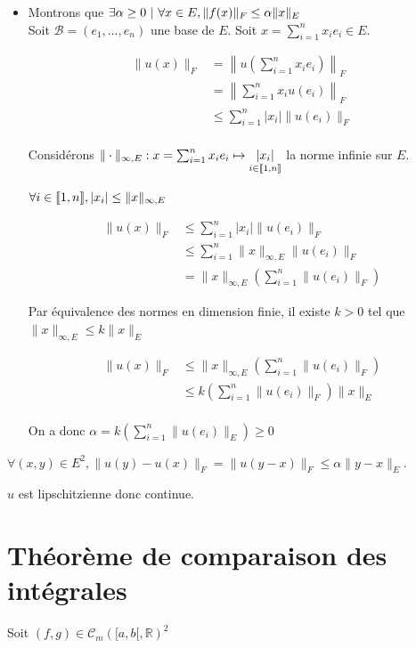\documentclass[]{article}
\begin{document}
\begin{itemize}
    \item Montrons que $\exists \alpha \geq 0 \text{ } | \text{ } \forall x \in E, \|f(x)\|_F \leq \alpha \|x\|_E$\\
    
    Soit $\mathcal{B} = (e_1,\dots, e_n)$ une base de $E$. Soit $x = \sum_{i=1}^{n} x_i e_i \in E$. 

    \begin{align*}
        \|u(x)\|_F &= \left \|u(\sum_{i=1}^{n} x_i e_i ) \right \|_F \\
        &= \left \| \sum_{i=1}^{n} x_i u(e_i) \right \|_F \\
        &\leq \sum_{i=1}^{n} |x_i| \| u(e_i) \|_F \\
    \end{align*}

    Considérons $\|\cdot\|_{\infty, E} : x = \sum_{i=1}^{n} x_i e_i \mapsto \underset{i \in \llbracket {1}, {n} \rrbracket}{|x_i|}$ la norme infinie sur $E$. 
    
    $\forall i \in \llbracket {1}, {n} \rrbracket, |x_i| \leq \|x\|_{\infty, E}$

    \begin{align*}
        \|u(x)\|_F 
        &\leq \sum_{i=1}^{n} |x_i| \| u(e_i) \|_F \\
        &\leq \sum_{i=1}^{n} \|x\|_{\infty, E} \| u(e_i) \|_F \\
        &= \|x\|_{\infty, E} \left(\sum_{i=1}^{n} \| u(e_i) \|_F \right)
    \end{align*}

    Par équivalence des normes en dimension finie, il existe $k > 0$ tel que $\|x\|_{\infty, E} \leq k \|x\|_E$

    \begin{align*}
        \|u(x)\|_F 
        &\leq \|x\|_{\infty, E} \left(\sum_{i=1}^{n} \| u(e_i) \|_F \right) \\
        &\leq k \left(\sum_{i=1}^{n} \| u(e_i) \|_F \right) \|x\|_E \\
    \end{align*}

    On a donc $\alpha = k \left(\sum_{i=1}^{n} \| u(e_i) \|_E \right) \geq 0$
\end{itemize}

$\forall (x, y) \in E^2, \|u(y)-u(x)\|_F = \|u(y - x)\|_F \leq \alpha\|y-x\|_E $.

$u$ est lipschitzienne donc continue. 

\section{Théorème de comparaison des intégrales}
Soit $(f, g) \in \mathcal{C}_m([a, b[, \mathbb{R})^2$
\end{document}
